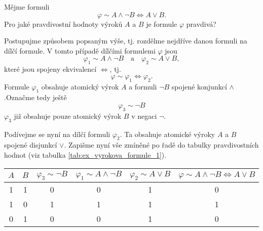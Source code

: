 \begin{example}\label{ex:vyrokova_formule_1}
    Mějme formuli
    \begin{equation*}
        \varphi\sim A \land \neg B \iff A \lor B.
    \end{equation*}
    Pro jaké pravdivostní hodnoty výroků $A$ a $B$ je formule $\varphi$ pravdivá?
    \begin{solution}
        Postupujme způsobem popsaným výše, tj. rozdělme nejdříve danou formuli na dílčí formule. V tomto případě dílčími formulemi $\varphi$ jsou
        \begin{equation*}
            \varphi_1\sim A \land \neg B \quad \text{a} \quad \varphi_2\sim A \lor B,
        \end{equation*}
        které jsou spojeny ekvivalencí $\iff$, tj.
        \begin{equation*}
            \varphi\sim \varphi_1 \iff \varphi_2.
        \end{equation*}
        Formule $\varphi_1$ obsahuje atomický výrok $A$ a formuli $\neg B$ spojené konjunkcí $\land$.\linebreak Označme tedy ještě
        \begin{equation*}
            \varphi_3\sim \neg B
        \end{equation*}
        $\varphi_3$ již obsahuje pouze atomický výrok $B$ v negaci $\neg$.\par
        Podívejme se nyní na dílčí formuli $\varphi_2$. Ta obsahuje atomické výroky $A$ a $B$ spojené disjunkcí $\lor$. Zapišme nyní vše zmíněné po řadě do tabulky pravdivostních hodnot (viz tabulka \ref{tab:ex_vyrokova_formule_1}).\par
        \begin{table}[h]
            \centering
            \begin{tabular}{|cc|cccc|}
            \hline
            $A$ & $B$ & $\varphi_3\sim \neg B$ & $\varphi_1\sim A \land \neg B$ & $\varphi_2\sim A \lor B$ & $\varphi\sim A \land \neg B \iff A \lor B$ \\ \hline
            1   & 1   & 0               & 0                          & 1                    & 0                                          \\
            1   & 0   & 1               & 1                          & 1                    & 1                                          \\
            0   & 1   & 0               & 0                          & 1                    & 0                                          \\

\end{tabular}
\end{table}
\end{solution}
\end{example}
